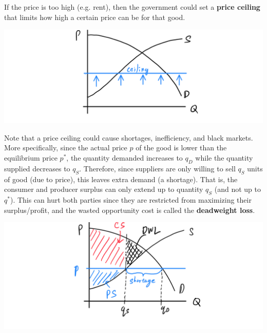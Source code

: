 \documentclass{article}
\begin{document}
    \begin{definition}
      If the price is too high (e.g. rent), then the government could set a \textbf{price ceiling} that limits how high a certain price can be for that good. 
      \begin{center}
        \includegraphics[scale=0.25]{img/Price_Celing.PNG}
      \end{center}
      Note that a price ceiling could cause shortages, inefficiency, and black markets. More specifically, since the actual price $p$ of the good is lower than the equilibrium price $p^*$, the quantity demanded increases to $q_D$ while the quantity supplied decreases to $q_S$. Therefore, since suppliers are only willing to sell $q_S$ units of good (due to price), this leaves extra demand (a shortage). That is, the consumer and producer surplus can only extend up to quantity $q_S$ (and not up to $q^*$). This can hurt both parties since they are restricted from maximizing their surplus/profit, and the wasted opportunity cost is called the \textbf{deadweight loss}. 
      \begin{center}
        \includegraphics[scale=0.25]{img/Price_Celing_DWL.PNG}
      \end{center}
    \end{definition}
\end{document}
